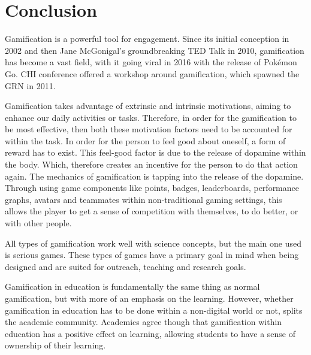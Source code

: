 \chapter{Conclusion}
\label{chap:conclusion}



	Gamification is a powerful tool for engagement. Since its initial conception in 2002 and then Jane McGonigal's groundbreaking TED Talk in 2010, gamification has become a vast field, with it going viral in 2016 with the release of Pokémon Go. CHI conference offered a workshop around gamification, which spawned the GRN in 2011. 
	
	Gamification takes advantage of extrinsic and intrinsic motivations, aiming to enhance our daily activities or tasks. Therefore, in order for the gamification to be most effective, then both these motivation factors need to be accounted for within the task. In order for the person to feel good about oneself, a form of reward has to exist. This feel-good factor is due to the release of dopamine within the body. Which, therefore creates an incentive for the person to do that action again. The mechanics of gamification is tapping into the release of the dopamine. Through using game components like points, badges, leaderboards, performance graphs, avatars and teammates within non-traditional gaming settings, this allows the player to get a sense of competition with themselves, to do better, or with other people.  
	
	All types of gamification work well with science concepts, but the main one used is serious games. These types of games have a primary goal in mind when being designed and are suited for outreach, teaching and research goals.
	
	Gamification in education is fundamentally the same thing as normal gamification, but with more of an emphasis on the learning. However, whether gamification in education has to be done within a non-digital world or not, splits the academic community. Academics agree though that gamification within education has a positive effect on learning, allowing students to have a sense of ownership of their learning.
	
